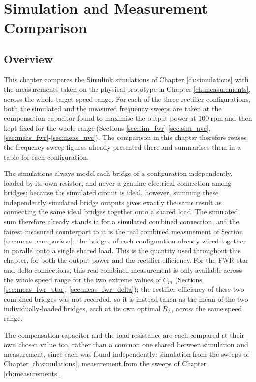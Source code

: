 \chapter{Simulation and Measurement Comparison}
\label{ch:comparison}

\section{Overview}
\label{sec:comp_overview}

This chapter compares the Simulink simulations of Chapter \ref{ch:simulations} with the measurements taken on the physical prototype in Chapter \ref{ch:measurements}, across the whole target speed range. For each of the three rectifier configurations, both the simulated and the measured frequency sweeps are taken at the compensation capacitor found to maximise the output power at $100\ \text{rpm}$ and then kept fixed for the whole range (Sections \ref{sec:sim_fwr}-\ref{sec:sim_nvc}, \ref{sec:meas_fwr}-\ref{sec:meas_nvc}). The comparison in this chapter therefore reuses the frequency-sweep figures already presented there and summarises them in a table for each configuration.

The simulations always model each bridge of a configuration independently, loaded by its own resistor, and never a genuine electrical connection among bridges; because the simulated circuit is ideal, however, summing these independently simulated bridge outputs gives exactly the same result as connecting the same ideal bridges together onto a shared load. The simulated sum therefore already stands in for a simulated combined connection, and the fairest measured counterpart to it is the real combined measurement of Section \ref{sec:meas_comparison}: the bridges of each configuration already wired together in parallel onto a single shared load. This is the quantity used throughout this chapter, for both the output power and the rectifier efficiency. For the FWR star and delta connections, this real combined measurement is only available across the whole speed range for the two extreme values of $C_m$ (Sections \ref{sec:meas_fwr_star}, \ref{sec:meas_fwr_delta}); the rectifier efficiency of these two combined bridges was not recorded, so it is instead taken as the mean of the two individually-loaded bridges, each at its own optimal $R_L$, across the same speed range.

The compensation capacitor and the load resistance are each compared at their own chosen value too, rather than a common one shared between simulation and measurement, since each was found independently: simulation from the sweeps of Chapter \ref{ch:simulations}, measurement from the sweeps of Chapter \ref{ch:measurements}.

